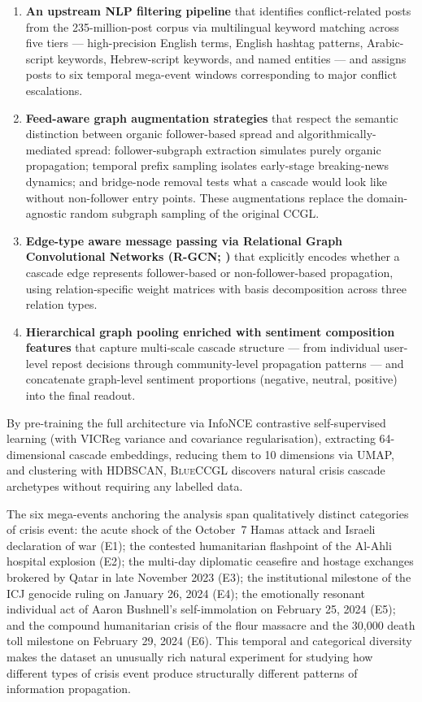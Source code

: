 \documentclass[12pt, a4paper]{article}
\newcommand{\BLUECCGL}{\textsc{BlueCCGL}\xspace}
\begin{document}
\begin{enumerate}
  \item \textbf{An upstream NLP filtering pipeline} that identifies conflict-related posts from the 235-million-post corpus via multilingual keyword matching across five tiers --- high-precision English terms, English hashtag patterns, Arabic-script keywords, Hebrew-script keywords, and named entities --- and assigns posts to six temporal mega-event windows corresponding to major conflict escalations.

  \item \textbf{Feed-aware graph augmentation strategies} that respect the semantic distinction between organic follower-based spread and algorithmically-mediated spread: follower-subgraph extraction simulates purely organic propagation; temporal prefix sampling isolates early-stage breaking-news dynamics; and bridge-node removal tests what a cascade would look like without non-follower entry points. These augmentations replace the domain-agnostic random subgraph sampling of the original CCGL.

  \item \textbf{Edge-type aware message passing via Relational Graph Convolutional Networks (R-GCN; \citealt{schlichtkrull2018rgcn})} that explicitly encodes whether a cascade edge represents follower-based or non-follower-based propagation, using relation-specific weight matrices with basis decomposition across three relation types.

  \item \textbf{Hierarchical graph pooling \citep{ying2018diffpool} enriched with sentiment composition features} that capture multi-scale cascade structure --- from individual user-level repost decisions through community-level propagation patterns --- and concatenate graph-level sentiment proportions (negative, neutral, positive) into the final readout.
\end{enumerate}

By pre-training the full architecture via InfoNCE contrastive self-supervised learning (with VICReg variance and covariance regularisation), extracting 64-dimensional cascade embeddings, reducing them to 10 dimensions via UMAP, and clustering with HDBSCAN, \BLUECCGL discovers natural crisis cascade archetypes without requiring any labelled data.

The six mega-events anchoring the analysis span qualitatively distinct categories of crisis event: the acute shock of the October~7 Hamas attack and Israeli declaration of war (E1); the contested humanitarian flashpoint of the Al-Ahli hospital explosion (E2); the multi-day diplomatic ceasefire and hostage exchanges brokered by Qatar in late November 2023 (E3); the institutional milestone of the ICJ genocide ruling on January 26, 2024 (E4); the emotionally resonant individual act of Aaron Bushnell's self-immolation on February 25, 2024 (E5); and the compound humanitarian crisis of the flour massacre and the 30,000 death toll milestone on February 29, 2024 (E6). This temporal and categorical diversity makes the dataset an unusually rich natural experiment for studying how different types of crisis event produce structurally different patterns of information propagation.
\end{document}
